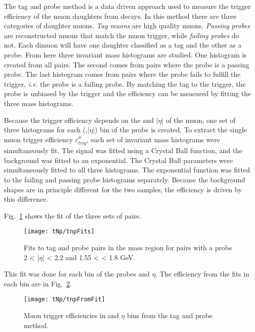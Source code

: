       The tag and probe method is a data driven approach used to measure the 
        trigger efficiency of the muon daughters from \JPsi{} decays.
      In this method there are three categories of daughter muons. 
      \textit{Tag muons} are high quality muons.
      \textit{Passing probes} are reconstructed muons that match the muon 
        trigger, while \textit{failing probes} do not. 
      Each dimuon will have one daughter classified as a tag and the other
        as a probe.
      From here three invariant mass histograms are studied. 
      One histogram is created from all pairs. 
      The second comes from pairs where the probe is a passing probe.  
      The last histogram comes from pairs where the probe fails to fulfill
        the trigger, \textit{i.e.} the probe is a failing probe. 
      By matching the tag to the trigger, the probe is unbiased by the trigger 
        and the  efficiency can be measured by fitting the three mass 
        histograms. 

      Because the trigger efficiency depends on the \pt{} and $|\eta|$ of the 
        muon, one set of three histograms for each (\pt{},$|\eta|$) bin of the
        probe is created.
      To extract the single muon trigger efficiency $\varepsilon^{\mu}_{trig}$, 
        each set of invariant mass histograms were simultaneously fit. 
      The signal was fitted using a Crystal Ball function, and the background 
        was fitted to an exponential.
      The Crystal Ball parameters were simultaneously fitted to all three 
        histograms.
      The exponential function was fitted to the failing and passing probe 
        histograms separately.
      Because the background shapes are in principle different for the two 
        samples, the efficiency is driven by this difference. 

      Fig.~\ref{fig:tnpFitPlot} shows the fit of the three sets of pairs. 
      \begin{figure}[!Hh]
        \centering
        \texttt{[image: tNp/tnpFits]}
        \caption{Fits to tag and probe pairs in the \JPsi{} mass region for
        pairs with a probe 2 < |$\eta$| < 2.2 and 1.55 < \pt{} < 1.8 GeV.}
        \label{fig:tnpFitPlot}
      \end{figure}
      This fit was done for each bin of the probes \pt{} and $\eta$.
      The efficiency from the fits in each bin are in Fig.~\ref{fig:tnpTrigMap}.
      \begin{figure}[!Hhbt]
        \centering
        \texttt{[image: tNp/tnpFromFit]}
        \caption{Muon trigger efficiencies in \pt{} and $\eta$ bins from 
          the tag and probe method.}
        \label{fig:tnpTrigMap}
      \end{figure}

